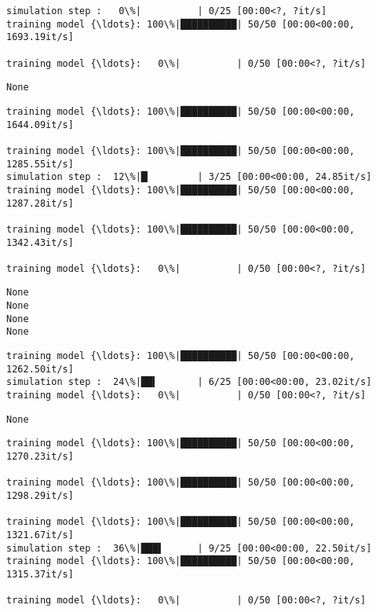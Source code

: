 \documentclass[11pt]{article}
\begin{document}
    \begin{Verbatim}[commandchars=\\\{\}]
simulation step :   0\%|          | 0/25 [00:00<?, ?it/s]
training model {\ldots}: 100\%|██████████| 50/50 [00:00<00:00, 1693.19it/s]

training model {\ldots}:   0\%|          | 0/50 [00:00<?, ?it/s]
    \end{Verbatim}

    \begin{Verbatim}[commandchars=\\\{\}]
None
    \end{Verbatim}

    \begin{Verbatim}[commandchars=\\\{\}]
training model {\ldots}: 100\%|██████████| 50/50 [00:00<00:00, 1644.09it/s]

training model {\ldots}: 100\%|██████████| 50/50 [00:00<00:00, 1285.55it/s]
simulation step :  12\%|█▏        | 3/25 [00:00<00:00, 24.85it/s]
training model {\ldots}: 100\%|██████████| 50/50 [00:00<00:00, 1287.28it/s]

training model {\ldots}: 100\%|██████████| 50/50 [00:00<00:00, 1342.43it/s]

training model {\ldots}:   0\%|          | 0/50 [00:00<?, ?it/s]
    \end{Verbatim}

    \begin{Verbatim}[commandchars=\\\{\}]
None
None
None
None
    \end{Verbatim}

    \begin{Verbatim}[commandchars=\\\{\}]
training model {\ldots}: 100\%|██████████| 50/50 [00:00<00:00, 1262.50it/s]
simulation step :  24\%|██▍       | 6/25 [00:00<00:00, 23.02it/s]
training model {\ldots}:   0\%|          | 0/50 [00:00<?, ?it/s]
    \end{Verbatim}

    \begin{Verbatim}[commandchars=\\\{\}]
None
    \end{Verbatim}

    \begin{Verbatim}[commandchars=\\\{\}]
training model {\ldots}: 100\%|██████████| 50/50 [00:00<00:00, 1270.23it/s]

training model {\ldots}: 100\%|██████████| 50/50 [00:00<00:00, 1298.29it/s]

training model {\ldots}: 100\%|██████████| 50/50 [00:00<00:00, 1321.67it/s]
simulation step :  36\%|███▌      | 9/25 [00:00<00:00, 22.50it/s]
training model {\ldots}: 100\%|██████████| 50/50 [00:00<00:00, 1315.37it/s]

training model {\ldots}:   0\%|          | 0/50 [00:00<?, ?it/s]
    \end{Verbatim}
\end{document}
